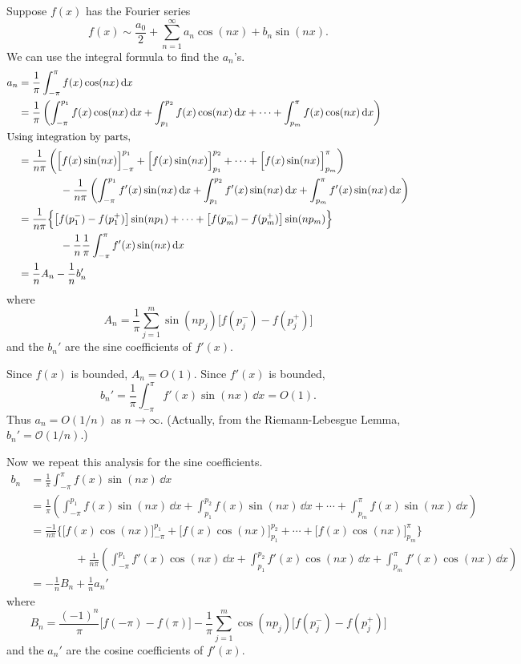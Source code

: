 Suppose $f(x)$ has the Fourier series
\[ f(x) \sim \frac{a_0}{2} + \sum_{n=1}^\infty a_n \cos(n x) + b_n \sin(n x).\]
We can use the integral formula to find the $a_n$'s.
\begin{align*}
  a_n     &= \frac{1}{\pi} \int_{-\pi}^\pi f(x) \cos(n x)\,\mathrm{d} x \\
  &= \frac{1}{\pi} \left( \int_{-\pi}^{p_1} f(x) \cos(n x)\,\mathrm{d} x
    + \int_{p_1}^{p_2} f(x) \cos(n x)\,\mathrm{d} x + \cdots
    + \int_{p_m}^{\pi} f(x) \cos(n x)\,\mathrm{d} x \right) \\
  \intertext{Using integration by parts,}
  &= \frac{1}{n\pi} \left(\Big[f(x) \sin(n x)\Big]_{-\pi}^{p_1}
    + \Big[f(x) \sin(n x)\Big]_{p_1}^{p_2} + \cdots
    + \Big[f(x) \sin(n x)\Big]_{p_m}^{\pi} \right) \\
  & \qquad \qquad - \frac{1}{n\pi} \left( \int_{-\pi}^{p_1} f'(x)\sin(n x)\,\mathrm{d} x
    + \int_{p_1}^{p_2} f'(x)\sin(n x)\,\mathrm{d} x
    +\int_{p_m}^{\pi} f'(x)\sin(n x)\,\mathrm{d} x \right) \\
  &= \frac{1}{n\pi} \Big\{ \big[f(p_1^-)-f(p_1^+)\big]\sin(n p_1)
  + \cdots + \big[f(p_m^-)-f(p_m^+)\big]\sin(n p_m) \Big\} \\
  &\qquad \qquad - \frac{1}{n} \frac{1}{\pi} 
  \int_{-\pi}^\pi f'(x)\sin(n x)\,\mathrm{d} x \\
  &= \frac{1}{n} A_n - \frac{1}{n} b_n'
\end{align*}
where 
\[ A_n = \frac{1}{\pi} \sum_{j=1}^m \sin(n p_j) 
\big[f(p_j^-) - f(p_j^+)\big] \]
and the $b_n'$ are the sine coefficients of $f'(x)$.

Since $f(x)$ is bounded, $A_n = O(1)$.  Since $f'(x)$ is bounded,
\[ b_n' = \frac{1}{\pi} \int_{-\pi}^\pi f'(x) \sin(n x)\,\dd x = O(1).\]
Thus $a_n = O(1/n)$ as $n \to \infty$.
(Actually, from the Riemann-Lebesgue Lemma, $b_n' = \mathcal{O}(1/n)$.)

Now we repeat this analysis for the sine coefficients.
\begin{align*}
  b_n     &= \frac{1}{\pi} \int_{-\pi}^\pi f(x) \sin(n x)\,\dd x \\
  &= \frac{1}{\pi} \left( \int_{-\pi}^{p_1} f(x) \sin(n x)\,\dd x
    + \int_{p_1}^{p_2} f(x) \sin(n x)\,\dd x + \cdots
    + \int_{p_m}^{\pi} f(x) \sin(n x)\,\dd x \right) \\
  &= \frac{-1}{n\pi} \Big\{\big[f(x) \cos(n x)\big]_{-\pi}^{p_1}
  + \big[f(x) \cos(n x)\big]_{p_1}^{p_2} + \cdots
  + \big[f(x) \cos(n x)\big]_{p_m}^{\pi} \Big\} \\
  & \qquad \qquad + \frac{1}{n\pi} \left( \int_{-\pi}^{p_1} f'(x)\cos(n x)\,\dd x
    + \int_{p_1}^{p_2} f'(x)\cos(n x)\,\dd x
    +\int_{p_m}^{\pi} f'(x)\cos(n x)\,\dd x \right) \\
  &= -\frac{1}{n} B_n + \frac{1}{n} a_n'
\end{align*}
where
\[ B_n = \frac{(-1)^n}{\pi} \big[f(-\pi) - f(\pi)\big] 
- \frac{1}{\pi} \sum_{j=1}^m \cos(n p_j)
\big[f(p_j^-) - f(p_j^+)\big] \]
and the $a_n'$ are the cosine coefficients of $f'(x)$.

